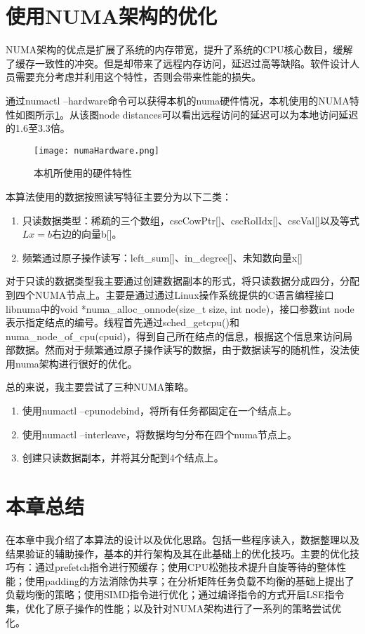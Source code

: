 \section{使用NUMA架构的优化}

NUMA架构的优点是扩展了系统的内存带宽，提升了系统的CPU核心数目，缓解了缓存一致性的冲突。但是却带来了远程内存访问，延迟过高等缺陷。软件设计人员需要充分考虑并利用这个特性，否则会带来性能的损失。

通过numactl --hardware命令可以获得本机的numa硬件情况，本机使用的NUMA特性如图所示\ref{numaHardware}。从该图node distances可以看出远程访问的延迟可以为本地访问延迟的1.6至3.3倍。

\begin{figure}[htbp]
    \centering
    \texttt{[image: numaHardware.png]}
    \caption{本机所使用的硬件特性}
    \label{numaHardware}
\end{figure}

本算法使用的数据按照读写特征主要分为以下二类：
\begin{enumerate} \setlength{\itemsep}{0pt}
    \item 只读数据类型：稀疏的三个数组，cscCowPtr[]、cscRolIdx[]、cscVal[]以及等式$Lx=b$右边的向量b[]。
    \item 频繁通过原子操作读写：left\_sum[]、in\_degree[]、未知数向量x[]
\end{enumerate}

对于只读的数据类型我主要通过创建数据副本的形式，将只读数据分成四分，分配到四个NUMA节点上。主要是通过通过Linux操作系统提供的C语言编程接口\cite{libnuma}libnuma中的void *numa\_alloc\_onnode(size\_t size, int node)，接口参数int node表示指定结点的编号。线程首先通过sched\_getcpu()和numa\_node\_of\_cpu(cpuid)，得到自己所在结点的信息，根据这个信息来访问局部数据。然而对于频繁通过原子操作读写的数据，由于数据读写的随机性，没法使用numa架构进行很好的优化。

总的来说，我主要尝试了三种NUMA策略。
\begin{enumerate} \setlength{\itemsep}{0pt}
    \item 使用numactl --cpunodebind，将所有任务都固定在一个结点上。
    \item 使用numactl --interleave，将数据均匀分布在四个numa节点上。
    \item 创建只读数据副本，并将其分配到4个结点上。
\end{enumerate}


\section{本章总结}

在本章中我介绍了本算法的设计以及优化思路。包括一些程序读入，数据整理以及结果验证的辅助操作，基本的并行架构及其在此基础上的优化技巧。主要的优化技巧有：通过prefetch指令进行预缓存；使用CPU松弛技术提升自旋等待的整体性能；使用padding的方法消除伪共享；在分析矩阵任务负载不均衡的基础上提出了负载均衡的策略；使用SIMD指令进行优化；通过编译指令的方式开启LSE指令集，优化了原子操作的性能；以及针对NUMA架构进行了一系列的策略尝试优化。


\endinput